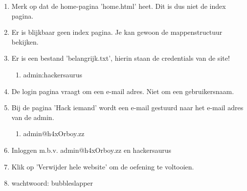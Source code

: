\begin{enumerate}
  \item Merk op dat de home-pagina 'home.html' heet. Dit is dus niet de index pagina.
  \item Er is blijkbaar geen index pagina. Je kan gewoon de mappenstructuur bekijken.
  \item Er is een bestand 'belangrijk.txt', hierin staan de credentials van de site!
	\begin{enumerate}
	\item admin:hackersaurus
	\end{enumerate}
  \item De login pagina vraagt om een e-mail adres. Niet om een gebruikersnaam.
  \item Bij de pagina 'Hack iemand' wordt een e-mail gestuurd naar het e-mail adres van de admin.
  	\begin{enumerate}
	\item admin@h4xOrboy.zz
	\end{enumerate}
  \item Inloggen m.b.v. admin@h4xOrboy.zz en hackersaurus
  \item Klik op 'Verwijder hele website' om de oefening te voltooien.
  \item wachtwoord: bubbleslapper
\end{enumerate}
